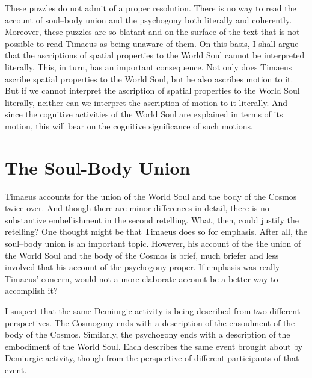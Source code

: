 These puzzles do not admit of a proper resolution. There is no way to read the account of soul--body union and the psychogony both literally and coherently. Moreover, these puzzles are so blatant and on the surface of the text that is not possible to read Timaeus as being unaware of them. On this basis, I shall argue that the ascriptions of spatial properties to the World Soul cannot be interpreted literally. This, in turn, has an important consequence. Not only does Timaeus ascribe spatial properties to the World Soul, but he also ascribes motion to it. But if we cannot interpret the ascription of spatial properties to the World Soul literally, neither can we interpret the ascription of motion to it literally. And since the cognitive activities of the World Soul are explained in terms of its motion, this will bear on the cognitive significance of such motions.


\section{The Soul-Body Union} %
\label{sec:the_embodiment_of_the_world_soul}

Timaeus accounts for the union of the World Soul and the body of the Cosmos twice over. And though there are minor differences in detail, there is no substantive embellishment in the second retelling. What, then, could justify the retelling? One thought might be that Timaeus does so for emphasis. After all, the soul--body union is an important topic. However, his account of the the union of the World Soul and the body of the Cosmos is brief, much briefer and less involved that his account of the psychogony proper. If emphasis was really Timaeus' concern, would not a more elaborate account be a better way to accomplish it? 

I suspect that the same Demiurgic activity is being described from two different perspectives. The Cosmogony ends with a description of the ensoulment of the body of the Cosmos. Similarly, the psychogony ends with a description of the embodiment of the World Soul. Each describes the same event brought about by Demiurgic activity, though from the perspective of different participants of that event.

